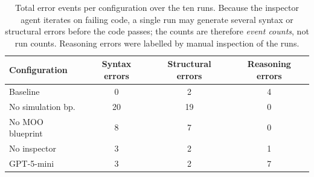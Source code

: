 \documentclass[a4paper,fleqn]{cas-sc}
\begin{document}
  \begin{table}[]                                                                                                                       
  \centering                                                                                                                                
  \caption{Total error events per configuration over the ten runs. Because                                                                  
  the inspector agent iterates on failing code, a single run may generate                                                                   
  several syntax or structural errors before the code passes; the counts                                                                    
  are therefore \emph{event counts}, not run counts. Reasoning errors were                                                                  
  labelled by manual inspection of the runs.}                                                                                               
  \label{tab:ablation_errors}                                                                                                               
  \begin{tabular}{@{}l c c c@{}}                                                                                                            
  \toprule                                                                                                                                  
  \textbf{Configuration} & \textbf{Syntax errors} & \textbf{Structural errors} & \textbf{Reasoning errors} \\                               
  \midrule                                                                                                                                  
  Baseline              & 0  & 2  & 4 \\                                                                                                    
  No simulation bp.     & 20 & 19 & 0 \\                                                                                                    
  No MOO blueprint      & 8  & 7  & 0 \\                                                                                                    
  No inspector          & 3  & 2  & 1 \\                                                                                                    
  GPT-5-mini            & 3  & 2  & 7 \\                                                                                                    

\end{tabular}
\end{table}
\end{document}
